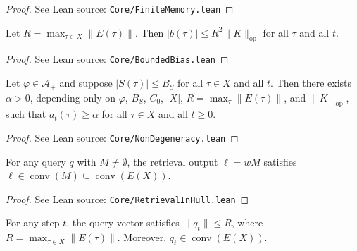 \begin{proof}
\leanok
{}
See Lean source: \texttt{Core/FiniteMemory.lean}
\end{proof}

\begin{corollary}
\label{cor:bounded}
\leanok
{}
Let $R = \max_{\tau \in X} \|E(\tau)\|$. Then $|b(\tau)| \leq R^2 \|K\|_{\mathrm{op}}$ for all $\tau$ and all $t$.
\end{corollary}

\begin{proof}
\leanok
{}
See Lean source: \texttt{Core/BoundedBias.lean}
\end{proof}

\begin{theorem}
\label{thm:nondegen}
\leanok
{}
Let $\varphi \in \mathcal{A}_+$ and suppose $|S(\tau)| \leq B_S$ for all $\tau \in X$ and all $t$. Then there exists $\alpha > 0$, depending only on $\varphi$, $B_S$, $C_0$, $|X|$, $R = \max_\tau \|E(\tau)\|$, and $\|K\|_{\mathrm{op}}$, such that $a_t(\tau) \geq \alpha$ for all $\tau \in X$ and all $t \geq 0$.
\end{theorem}

\begin{proof}
\leanok
{}
See Lean source: \texttt{Core/NonDegeneracy.lean}
\end{proof}

\begin{corollary}
\label{cor:retrieval_in_hull}
\leanok
{}
For any query $q$ with $M \neq \emptyset$, the retrieval output $\ell = wM$ satisfies $\ell \in \operatorname{conv}(M) \subseteq \operatorname{conv}(E(X))$.
\end{corollary}

\begin{proof}
\leanok
{}
See Lean source: \texttt{Core/RetrievalInHull.lean}
\end{proof}

\begin{corollary}
\label{cor:query_norm_bound}
\leanok
{}
For any step $t$, the query vector satisfies
$\|q_t\| \leq R$, where $R = \max_{\tau \in X} \|E(\tau)\|$.
Moreover, $q_t \in \operatorname{conv}(E(X))$.
\end{corollary}

